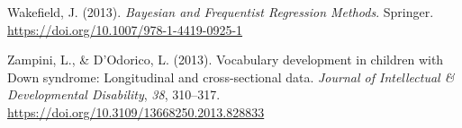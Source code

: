 \documentclass[
  11pt,
  a4paper,
]{report}
\newlength{\cslhangindent}
\newenvironment{CSLReferences}[2] %
 {\begin{list}{}{%
  \setlength{\itemindent}{0pt}
  \setlength{\leftmargin}{0pt}
  \setlength{\parsep}{0pt}
  \ifodd #1
   \setlength{\leftmargin}{\cslhangindent}
   \setlength{\itemindent}{-1\cslhangindent}
  \fi
  \setlength{\itemsep}{#2\baselineskip}}}
 {\end{list}}
\begin{document}
\begin{CSLReferences}{1}{0}
Wakefield, J. (2013). \emph{Bayesian and {Frequentist Regression
Methods}}. Springer. \url{https://doi.org/10.1007/978-1-4419-0925-1}

Zampini, L., \& D'Odorico, L. (2013). Vocabulary development in children
with {Down} syndrome: Longitudinal and cross-sectional data.
\emph{Journal of Intellectual \& Developmental Disability}, \emph{38},
310--317. \url{https://doi.org/10.3109/13668250.2013.828833}

\end{CSLReferences}
\end{document}

